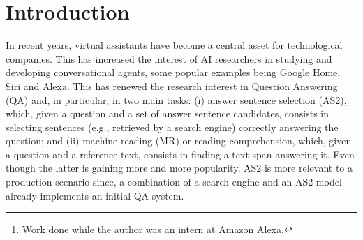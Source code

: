 \documentclass[letterpaper]{article} \usepackage{aaai20}  \usepackage{times}  \usepackage{helvet} \usepackage{courier}  \usepackage[hyphens]{url}  \usepackage{graphicx} \urlstyle{rm} \def\UrlFont{\rm}  \usepackage{graphicx}  \usepackage{todonotes}
\author{
Siddhant Garg \thanks{Work done while the author was an intern at Amazon Alexa.} \\ University of Wisconsin-Madison\\ Madison, WI, USA \\ \texttt{sidgarg@cs.wisc.edu} \And Thuy Vu \\ Amazon Alexa\\ Manhattan Beach, CA, USA \\\texttt{thuyvu@amazon.com} \And Alessandro Moschitti \\
Amazon Alexa\\ Manhattan Beach, CA, USA \\\texttt{amosch@amazon.com}
}
\newcommand{\TANDA}{T{\sc and}A}
\begin{document}
\maketitle

\newcommand{\delete}[1]{{\color{red}\st{#1}}} \newcommand{\touch}[1]{{\color{blue}{#1}}} \newcommand{\insrt}[1]{{\color{mygreen}{#1}}} 

\begin{abstract}

We propose {\TANDA}, an effective technique for fine-tuning pre-trained Transformer models for natural language tasks. Specifically, we first \emph{transfer} a pre-trained model into a model for a general task by fine-tuning it with a large and high-quality dataset. We then perform a second fine-tuning step to \emph{adapt} the transferred model to the target domain. We demonstrate the benefits of our approach for answer sentence selection, which is a well-known inference task in Question Answering. We built a large scale dataset to enable the transfer step, exploiting the Natural Questions dataset.
Our approach establishes the state of the art on two well-known benchmarks, WikiQA and TREC-QA, achieving MAP scores of 92\% and 94.3\%, respectively, which largely outperform the previous highest scores of 83.4\% and 87.5\%, obtained in very recent work.
We empirically show that {\TANDA} generates more stable and robust models reducing the effort required for selecting optimal hyper-parameters.
Additionally, we show that the transfer step of {\TANDA} makes the adaptation step more robust to noise.
This enables a more effective use of noisy datasets for fine-tuning. Finally, we also confirm the positive impact of {\TANDA} in an industrial setting, using domain specific datasets subject to different types of noise.
\end{abstract}


\section{Introduction}
In recent years, virtual assistants have become a central asset for technological companies.
This has increased the interest of AI researchers in studying and developing conversational agents, some popular examples being Google Home, Siri and Alexa. This has renewed the research interest in Question Answering (QA) and, in particular, in two main tasks: (i) answer sentence selection (AS2), which, given a question and a set of answer sentence candidates, consists in selecting sentences (e.g., retrieved by a search engine) correctly answering the question; and (ii) machine reading (MR) \cite{DBLP:journals/corr/ChenFWB17} or reading comprehension, which, given a question and a reference text, consists in finding a text span answering it. Even though the latter is gaining more and more popularity, AS2 is more relevant to a production scenario since, a combination of a search engine and an AS2 model already implements an initial QA system.
\end{document}
